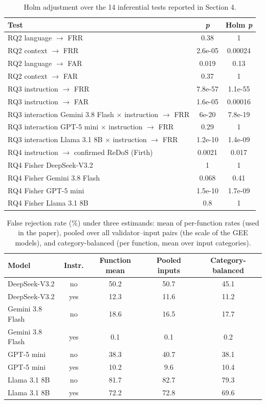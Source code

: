 \begin{table}[H]
\caption{Holm adjustment over the 14 inferential tests reported in Section 4.\label{tab:holm}}
\begin{tabularx}{\textwidth}{Xcc}
\toprule
\textbf{Test} & \textbf{\emph{p}} & \textbf{Holm \emph{p}}\\
\midrule
RQ2 language $\rightarrow$ FRR & 0.38 & 1\\
RQ2 context $\rightarrow$ FRR & 2.6e-05 & 0.00024\\
RQ2 language $\rightarrow$ FAR & 0.019 & 0.13\\
RQ2 context $\rightarrow$ FAR & 0.37 & 1\\
RQ3 instruction $\rightarrow$ FRR & 7.8e-57 & 1.1e-55\\
RQ3 instruction $\rightarrow$ FAR & 1.6e-05 & 0.00016\\
RQ3 interaction Gemini 3.8 Flash $\times$ instruction $\rightarrow$ FRR & 6e-20 & 7.8e-19\\
RQ3 interaction GPT-5 mini $\times$ instruction $\rightarrow$ FRR & 0.29 & 1\\
RQ3 interaction Llama 3.1 8B $\times$ instruction $\rightarrow$ FRR & 1.2e-10 & 1.4e-09\\
RQ4 instruction $\rightarrow$ confirmed ReDoS (Firth) & 0.0021 & 0.017\\
RQ4 Fisher DeepSeek-V3.2 & 1 & 1\\
RQ4 Fisher Gemini 3.8 Flash & 0.068 & 0.41\\
RQ4 Fisher GPT-5 mini & 1.5e-10 & 1.7e-09\\
RQ4 Fisher Llama 3.1 8B & 0.8 & 1\\
\bottomrule
\end{tabularx}
\end{table}

\begin{table}[H]
\caption{False rejection rate (\%) under three estimands: mean of per-function rates (used in the paper), pooled over all validator--input pairs (the scale of the GEE models), and category-balanced (per function, mean over input categories).\label{tab:estimands}}
\begin{tabularx}{\textwidth}{lcCCC}
\toprule
\textbf{Model} & \textbf{Instr.} & \textbf{Function mean} & \textbf{Pooled inputs} & \textbf{Category-balanced}\\
\midrule
DeepSeek-V3.2 & no & 50.2 & 50.7 & 45.1\\
DeepSeek-V3.2 & yes & 12.3 & 11.6 & 11.2\\
Gemini 3.8 Flash & no & 18.6 & 16.5 & 17.7\\
Gemini 3.8 Flash & yes & 0.1 & 0.1 & 0.2\\
GPT-5 mini & no & 38.3 & 40.7 & 38.1\\
GPT-5 mini & yes & 10.2 & 9.6 & 10.4\\
Llama 3.1 8B & no & 81.7 & 82.7 & 79.3\\
Llama 3.1 8B & yes & 72.2 & 72.8 & 69.6\\
\bottomrule
\end{tabularx}
\end{table}

